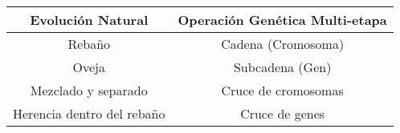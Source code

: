 \begin{table}[h]
	\centering
	\begin{tabular}{|c|c|}
		\hline
		\textbf{Evolución Natural}          & \textbf{Operación Genética Multi-etapa} \\ \hline
		Rebaño                     & Cadena (Cromosoma)             \\ \hline
		Oveja                      & Subcadena (Gen)                \\ \hline
		Mezclado y separado        & Cruce de cromosomas            \\ \hline
		Herencia dentro del rebaño & Cruce de genes                 \\ \hline
	\end{tabular}
\end{table}